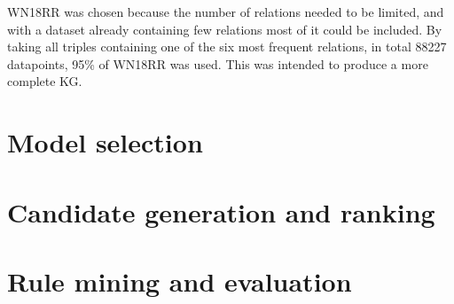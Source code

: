 WN18RR was chosen because the number of relations needed to be limited, and with a dataset already containing few relations most of it could be included. By taking all triples containing one of the six most frequent relations, in total 88227 datapoints, 95\% of WN18RR was used. This was intended to produce a more complete KG.

\section{Model selection}


\section{Candidate generation and ranking}



\section{Rule mining and evaluation}
